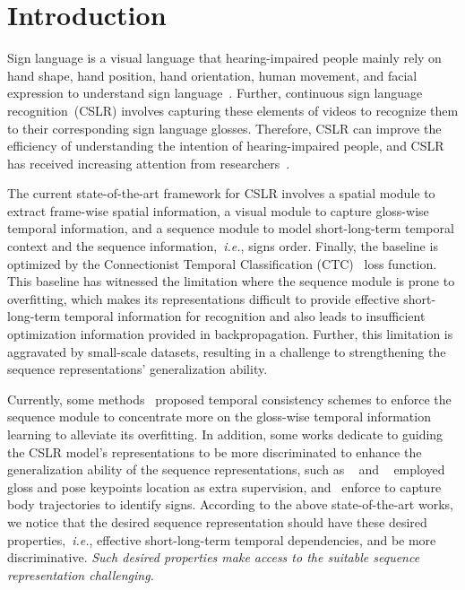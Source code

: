 \documentclass[sigconf]{acmart}
\begin{document}
\section{Introduction}
\label{sec:intro}

Sign language is a visual language that hearing-impaired people mainly rely on hand shape, hand position, hand orientation, human movement, and facial expression to understand sign language~\cite{sutton1999linguistics}. 
Further, continuous sign language recognition~(CSLR) involves capturing these elements of videos to recognize them to their corresponding sign language glosses.
Therefore, CSLR can improve the efficiency of understanding the intention of hearing-impaired people, and CSLR has received increasing attention from researchers~\cite{bragg2019sign,rastgoo2021sign}.

The current state-of-the-art framework for CSLR involves a spatial module to extract frame-wise spatial information, a visual module to capture gloss-wise temporal information, 
and a sequence module to model short-long-term temporal context and the sequence information,~\textit{i.e.}, signs order.
Finally, the baseline is optimized by the Connectionist Temporal Classification (CTC)~\cite{graves2006connectionist} loss function.
This baseline has witnessed the limitation where the sequence module is prone to overfitting, which makes its representations difficult to provide effective short-long-term temporal information for recognition and also leads to insufficient optimization information provided in backpropagation.
Further, this limitation is aggravated by small-scale datasets, resulting in a challenge to strengthening the sequence representations' generalization ability.




Currently, some methods~\cite{pu2019iterative, pu2020boosting, cheng2020fully, min2021visual,hao2021self, zuo2022c2slr} proposed temporal consistency schemes to enforce the sequence module to concentrate more on the gloss-wise temporal information learning to alleviate its overfitting. 
In addition, some works dedicate to guiding the CSLR model's representations to be more discriminated to enhance the generalization ability of the sequence representations, such as ~\cite{pu2019iterative, pu2020boosting} and ~\cite{zuo2022c2slr} employed gloss and pose keypoints location as extra supervision, and~\cite{hu2022temporal,Hu2022SelfEmphasizingNF,hu2023continuous} enforce to capture body trajectories to 
identify signs.
According to the above state-of-the-art works, we notice that the desired sequence representation should have  these desired properties,~\textit{i.e.}, effective  short-long-term temporal dependencies, and be more discriminative.
\textit{Such desired properties make access to the suitable sequence representation challenging.}
\end{document}
